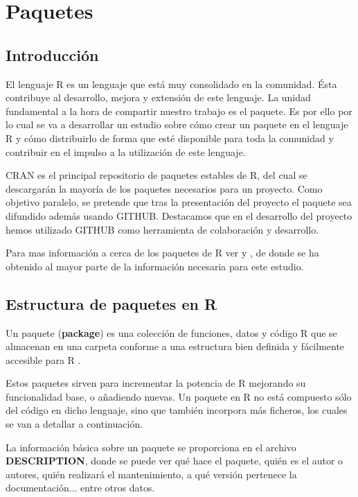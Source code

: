 \section{Paquetes}
\subsection{Introducci\'on}


El lenguaje R es un lenguaje que est\'a muy consolidado en la comunidad. \'Esta contribuye al desarrollo, mejora y extensi\'on de este lenguaje. La unidad fundamental a la hora de compartir 
nuestro trabajo es el paquete. Es por ello por lo cual se va a desarrollar un estudio sobre c\'omo crear un paquete en el lenguaje R y c\'omo distribuirlo de forma que est\'e disponible para toda la comunidad y contribuir en el impulso a la utilizaci\'on de este lenguaje.

CRAN es el principal repositorio de paquetes estables de R, del cual se descargar\'an la mayor\'ia de los paquetes necesarios para un proyecto. Como objetivo paralelo, se pretende que tras la presentaci\'on del proyecto el paquete sea difundido adem\'as usando GITHUB.  Destacamos que en el desarrollo del proyecto hemos utilizado GITHUB como herramienta de colaboración y desarrollo. 

Para mas informaci\'on a cerca de los paquetes de R ver \cite{rcore} y \cite{book}, de donde se ha obtenido al mayor parte de la informaci\'on necesaria para este estudio.
\subsection{Estructura de paquetes en R}

Un paquete (\textbf{package}) es una colecci\'on de funciones, datos y c\'odigo R que se almacenan en una carpeta 
conforme a una estructura bien definida y f\'acilmente accesible para R \cite{librR}.

Estos paquetes sirven para incrementar la potencia de R mejorando su funcionalidad base, o a\~nadiendo 
nuevas.
Un paquete en R no est\'a compuesto s\'olo del c\'odigo en dicho lenguaje, sino que tambi\'en incorpora m\'as ficheros, 
los cuales se van a detallar a continuaci\'on.\cite{rParaTodos}

La informaci\'on b\'asica sobre un paquete se proporciona en el archivo \textbf{DESCRIPTION}, donde se puede ver qu\'e hace 
el paquete, qui\'en es el autor o autores, qui\'en realizar\'a el mantenimiento, a qu\'e versi\'on pertenece la documentaci\'on... entre otros datos.

